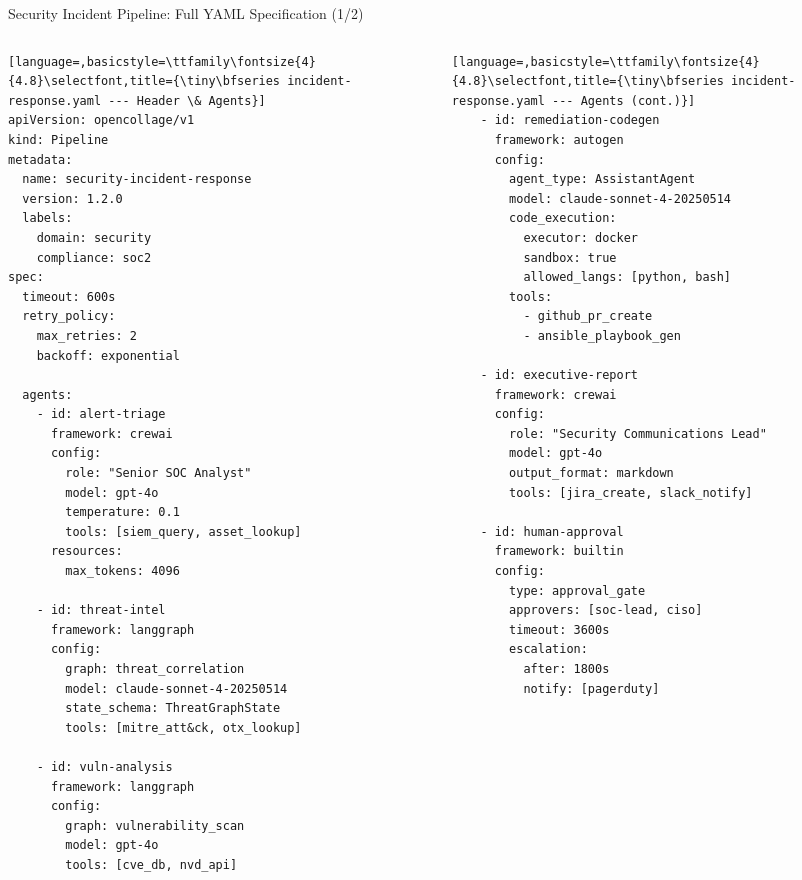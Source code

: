 \begin{frame}[fragile]{\fontsize{11}{13}\selectfont Security Incident Pipeline: Full YAML Specification (1/2)}
  \vspace{-0.2cm}
  \begin{columns}[T]
    \begin{column}{0.50\textwidth}
      \begin{lstlisting}[language=,basicstyle=\ttfamily\fontsize{4}{4.8}\selectfont,title={\tiny\bfseries incident-response.yaml --- Header \& Agents}]
apiVersion: opencollage/v1
kind: Pipeline
metadata:
  name: security-incident-response
  version: 1.2.0
  labels:
    domain: security
    compliance: soc2
spec:
  timeout: 600s
  retry_policy:
    max_retries: 2
    backoff: exponential

  agents:
    - id: alert-triage
      framework: crewai
      config:
        role: "Senior SOC Analyst"
        model: gpt-4o
        temperature: 0.1
        tools: [siem_query, asset_lookup]
      resources:
        max_tokens: 4096

    - id: threat-intel
      framework: langgraph
      config:
        graph: threat_correlation
        model: claude-sonnet-4-20250514
        state_schema: ThreatGraphState
        tools: [mitre_att&ck, otx_lookup]

    - id: vuln-analysis
      framework: langgraph
      config:
        graph: vulnerability_scan
        model: gpt-4o
        tools: [cve_db, nvd_api]
      \end{lstlisting}
    \end{column}
    \begin{column}{0.50\textwidth}
      \begin{lstlisting}[language=,basicstyle=\ttfamily\fontsize{4}{4.8}\selectfont,title={\tiny\bfseries incident-response.yaml --- Agents (cont.)}]
    - id: remediation-codegen
      framework: autogen
      config:
        agent_type: AssistantAgent
        model: claude-sonnet-4-20250514
        code_execution:
          executor: docker
          sandbox: true
          allowed_langs: [python, bash]
        tools:
          - github_pr_create
          - ansible_playbook_gen

    - id: executive-report
      framework: crewai
      config:
        role: "Security Communications Lead"
        model: gpt-4o
        output_format: markdown
        tools: [jira_create, slack_notify]

    - id: human-approval
      framework: builtin
      config:
        type: approval_gate
        approvers: [soc-lead, ciso]
        timeout: 3600s
        escalation:
          after: 1800s
          notify: [pagerduty]
      \end{lstlisting}
    \end{column}
  \end{columns}
\end{frame}

